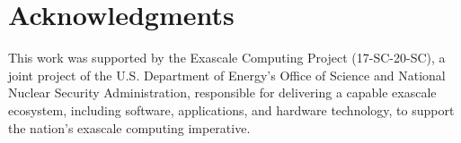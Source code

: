 \documentclass[../main.tex]{subfiles}
\begin{document}
\newpage

\section*{Acknowledgments}
\label{acknowledgements}

This work was supported by the Exascale Computing Project (17-SC-20-SC), a joint project of the U.S. Department of Energy’s Office of Science and National Nuclear Security Administration, responsible for delivering a capable exascale ecosystem, including software, applications, and hardware technology, to support the nation’s exascale computing imperative.
\end{document}
